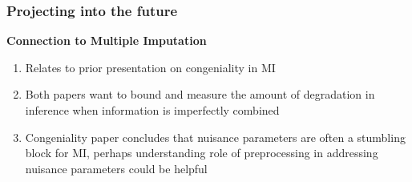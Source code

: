 \documentclass[10pt, compress]{beamer}
\begin{document}
\begin{frame}[fragile]
    \frametitle{Projecting into the future}
    
    \textbf{Connection to Multiple Imputation} 
    
    \begin{enumerate}
    \item Relates to prior presentation on congeniality in MI
    \item Both papers want to bound and measure the amount of degradation in inference when information is imperfectly combined
    \item Congeniality paper concludes that nuisance parameters are often a stumbling block for MI, perhaps understanding role of preprocessing in addressing nuisance parameters could be helpful
    \end{enumerate}
    
\end{frame}
\end{document}
